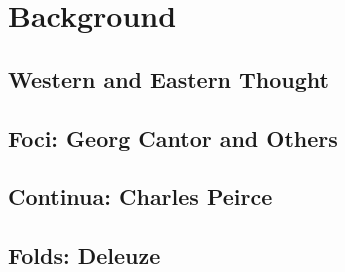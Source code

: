 \chapter{Background}
\label{ch:background}

\section{Western and Eastern Thought}

\section{Foci: Georg Cantor and Others}

\section{Continua: Charles Peirce}

\section{Folds: Deleuze}

